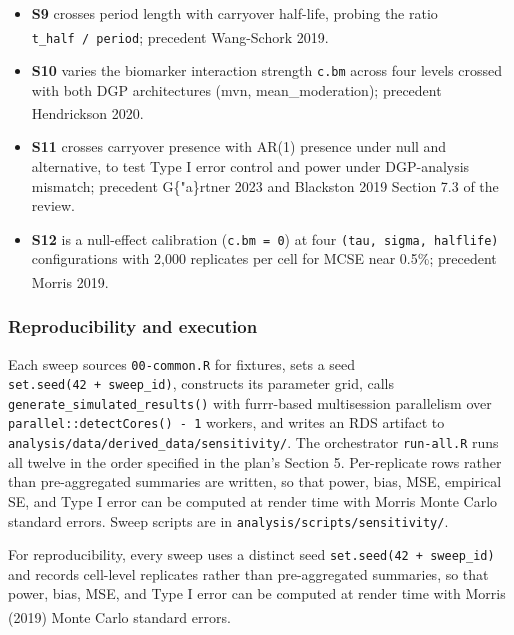 \documentclass[
  11pt,
]{article}
\begin{document}
\begin{itemize}
\item
  \textbf{S9} crosses period length with carryover half-life, probing
  the ratio \texttt{t\_half\ /\ period}; precedent Wang-Schork
  2019\textsuperscript{}.
\item
  \textbf{S10} varies the biomarker interaction strength \texttt{c.bm}
  across four levels crossed with both DGP architectures (mvn,
  mean\_moderation); precedent Hendrickson
  2020\textsuperscript{}.
\item
  \textbf{S11} crosses carryover presence with AR(1) presence under null
  and alternative, to test Type I error control and power under
  DGP-analysis mismatch; precedent G\{"a\}rtner 2023 and Blackston 2019
  Section 7.3 of the review.
\item
  \textbf{S12} is a null-effect calibration (\texttt{c.bm\ =\ 0}) at
  four \texttt{(tau,\ sigma,\ halflife)} configurations with 2,000
  replicates per cell for MCSE near 0.5\%; precedent Morris
  2019\textsuperscript{}.
\end{itemize}

\subsubsection{Reproducibility and
execution}\label{reproducibility-and-execution}

Each sweep sources \texttt{00-common.R} for fixtures, sets a seed
\texttt{set.seed(42\ +\ sweep\_id)}, constructs its parameter grid,
calls \texttt{generate\_simulated\_results()} with furrr-based
multisession parallelism over \texttt{parallel::detectCores()\ -\ 1}
workers, and writes an RDS artifact to
\texttt{analysis/data/derived\_data/sensitivity/}. The orchestrator
\texttt{run-all.R} runs all twelve in the order specified in the plan's
Section 5. Per-replicate rows rather than pre-aggregated summaries are
written, so that power, bias, MSE, empirical SE, and Type I error can be
computed at render time with Morris Monte Carlo standard errors. Sweep
scripts are in \texttt{analysis/scripts/sensitivity/}.

For reproducibility, every sweep uses a distinct seed
\texttt{set.seed(42\ +\ sweep\_id)} and records cell-level replicates
rather than pre-aggregated summaries, so that power, bias, MSE, and Type
I error can be computed at render time with Morris (2019) Monte Carlo
standard errors\textsuperscript{}.
\end{document}
